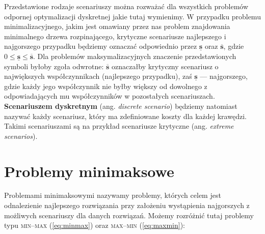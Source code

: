 Przedstawione rodzaje scenariuszy można rozważać dla wszystkich problemów odpornej optymalizacji dyskretnej jakie tutaj wymienimy. W przypadku problemu minimalizacyjnego, jakim jest omawiany przez nas problem znajdowania minimalnego drzewa rozpinającego, krytyczne scenariusze najlepszego i najgorszego przypadku będziemy oznaczać odpowiednio przez $\underline{\textbf{s}}$ oraz $\overline{\textbf{s}}$, gdzie $0 \leqslant \underline{\textbf{s}} \leqslant \overline{\textbf{s}}$. Dla problemów maksymalizacyjnych znaczenie przedstawionych symboli byłoby zgoła odwrotne: $\overline{\textbf{s}}$ oznaczałby krytyczny scenariusz o największych współczynnikach (najlepszego przypadku), zaś $\underline{\textbf{s}}$ --- najgorszego, gdzie każdy jego współczynnik nie byłby większy od dowolnego z odpowiadających mu współczynników w pozostałych scenariuszach. \textbf{Scenariuszem dyskretnym} (ang. \textit{discrete scenario}) będziemy natomiast nazywać każdy scenariusz, który ma zdefiniowane koszty dla każdej krawędzi. Takimi scenariuszami są na przykład scenariusze krytyczne (ang. \textit{extreme scenarios}).

\section{Problemy minimaksowe}

Problemami minimaksowymi nazywamy problemy, których celem jest odnalezienie najlepszego rozwiązania przy założeniu wystąpienia najgorszych z możliwych scenariuszy dla danych rozwiązań. Możemy rozróżnić tutaj problemy typu \textsc{min--max} (\ref{eq:minmax}) oraz \textsc{max--min} (\ref{eq:maxmin}):

